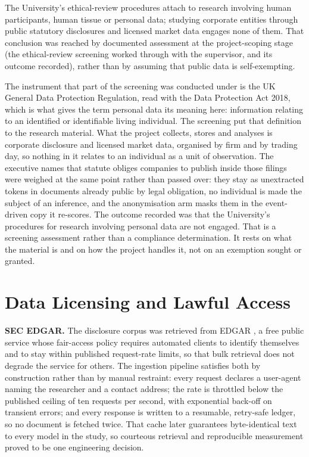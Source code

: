 The University's ethical-review procedures attach to research involving human participants, human tissue or personal data; studying corporate entities through public statutory disclosures and licensed market data engages none of them. That conclusion was reached by documented assessment at the project-scoping stage (the ethical-review screening worked through with the supervisor, and its outcome recorded), rather than by assuming that public data is self-exempting.

The instrument that part of the screening was conducted under is the UK General Data Protection Regulation, read with the Data Protection Act 2018, which is what gives the term personal data its meaning here: information relating to an identified or identifiable living individual. The screening put that definition to the research material. What the project collects, stores and analyses is corporate disclosure and licensed market data, organised by firm and by trading day, so nothing in it relates to an individual as a unit of observation. The executive names that statute obliges companies to publish inside those filings were weighed at the same point rather than passed over: they stay as unextracted tokens in documents already public by legal obligation, no individual is made the subject of an inference, and the anonymisation arm masks them in the event-driven copy it re-scores. The outcome recorded was that the University's procedures for research involving personal data are not engaged. That is a screening assessment rather than a compliance determination. It rests on what the material is and on how the project handles it, not on an exemption sought or granted.

\section{Data Licensing and Lawful Access}

\textbf{SEC EDGAR.} The disclosure corpus was retrieved from EDGAR \cite{sec2024edgar}, a free public service whose fair-access policy requires automated clients to identify themselves and to stay within published request-rate limits, so that bulk retrieval does not degrade the service for others. The ingestion pipeline satisfies both by construction rather than by manual restraint: every request declares a user-agent naming the researcher and a contact address; the rate is throttled below the published ceiling of ten requests per second, with exponential back-off on transient errors; and every response is written to a resumable, retry-safe ledger, so no document is fetched twice. That cache later guarantees byte-identical text to every model in the study, %
so courteous retrieval and reproducible measurement proved to be one engineering decision.

